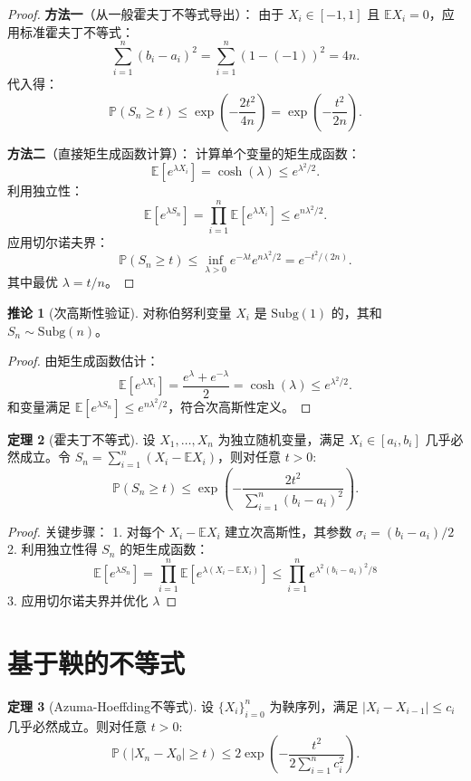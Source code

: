 \documentclass{article}
\theoremstyle{definition}
\newtheorem{theorem}{定理}
\newtheorem{corollary}[theorem]{推论}
\renewcommand{\P}{\mathbb{P}}
\newcommand{\E}{\mathbb{E}}
\newcommand{\1}{\mathbf{1}}
\newcommand{\subg}{\text{Subg}}
\begin{document}
\begin{proof}
\textbf{方法一}（从一般霍夫丁不等式导出）：
由于 \( X_i \in [-1,1] \) 且 \( \E X_i = 0 \)，应用标准霍夫丁不等式：
\[
\sum_{i=1}^n (b_i - a_i)^2 = \sum_{i=1}^n (1 - (-1))^2 = 4n.
\]
代入得：
\[
\P(S_n \geq t) \leq \exp\left(-\frac{2t^2}{4n}\right) = \exp\left(-\frac{t^2}{2n}\right).
\]

\textbf{方法二}（直接矩生成函数计算）：
计算单个变量的矩生成函数：
\[
\E[e^{\lambda X_i}] = \cosh(\lambda) \leq e^{\lambda^2/2}.
\]
利用独立性：
\[
\E[e^{\lambda S_n}] = \prod_{i=1}^n \E[e^{\lambda X_i}] \leq e^{n\lambda^2/2}.
\]
应用切尔诺夫界：
\[
\P(S_n \geq t) \leq \inf_{\lambda > 0} e^{-\lambda t} e^{n\lambda^2/2} = e^{-t^2/(2n)}.
\]
其中最优 \( \lambda = t/n \)。
\end{proof}

\begin{corollary}[次高斯性验证]
对称伯努利变量 \( X_i \) 是 \( \subg(1) \) 的，其和 \( S_n \sim \subg(n) \)。
\end{corollary}

\begin{proof}
由矩生成函数估计：
\[
\E[e^{\lambda X_i}] = \frac{e^\lambda + e^{-\lambda}}{2} = \cosh(\lambda) \leq e^{\lambda^2/2}.
\]
和变量满足 \( \E[e^{\lambda S_n}] \leq e^{n\lambda^2/2} \)，符合次高斯性定义。
\end{proof}

\begin{theorem}[霍夫丁不等式]
设 \( X_1, \dots, X_n \) 为独立随机变量，满足 \( X_i \in [a_i, b_i] \) 几乎必然成立。令 \( S_n = \sum_{i=1}^n (X_i - \E X_i) \)，则对任意 \( t > 0 \):
\[
\P(S_n \geq t) \leq \exp\left(-\frac{2t^2}{\sum_{i=1}^n (b_i - a_i)^2}\right).
\]
\end{theorem}

\begin{proof}
关键步骤：
1. 对每个 \( X_i - \E X_i \) 建立次高斯性，其参数 \( \sigma_i = (b_i - a_i)/2 \)
2. 利用独立性得 \( S_n \) 的矩生成函数：
\[
\E[e^{\lambda S_n}] = \prod_{i=1}^n \E[e^{\lambda (X_i - \E X_i)}] \leq \prod_{i=1}^n e^{\lambda^2 (b_i - a_i)^2/8}
\]
3. 应用切尔诺夫界并优化 \( \lambda \)
\end{proof}

\section{基于鞅的不等式}

\begin{theorem}[Azuma-Hoeffding不等式]
设 \( \{X_i\}_{i=0}^n \) 为鞅序列，满足 \( |X_i - X_{i-1}| \leq c_i \) 几乎必然成立。则对任意 \( t > 0 \):
\[
\P(|X_n - X_0| \geq t) \leq 2 \exp\left(-\frac{t^2}{2 \sum_{i=1}^n c_i^2}\right).
\]
\end{theorem}
\end{document}
